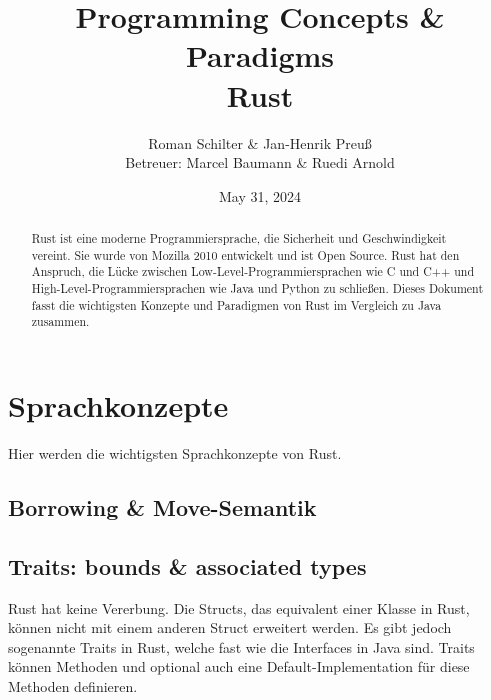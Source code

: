 \documentclass[letterpaper,12pt]{article}
\begin{document}
    \title{Programming Concepts \& Paradigms\\Rust}
    \author{Roman Schilter \& Jan-Henrik Preuß\\[0.4cm]{\small Betreuer: Marcel Baumann \& Ruedi Arnold}}
    \date{May 31, 2024}
    \maketitle


    \begin{abstract}
        Rust ist eine moderne Programmiersprache, die Sicherheit und Geschwindigkeit vereint.
        Sie wurde von Mozilla 2010 entwickelt und ist Open Source.
        Rust hat den Anspruch, die Lücke zwischen Low-Level-Programmiersprachen wie C und C++ und High-Level-Programmiersprachen wie Java und Python zu schließen.
        Dieses Dokument fasst die wichtigsten Konzepte und Paradigmen von Rust im Vergleich zu Java zusammen.
    \end{abstract}



    \section{Sprachkonzepte}

    Hier werden die wichtigsten Sprachkonzepte von Rust.

    \blindtext %

    \subsection{Borrowing \& Move-Semantik}\label{subsec:borrowing-&-move-semantik}

    \subsection{Traits: bounds \& associated types}\label{subsec:traits:-bounds-&-associated-types}
    Rust hat keine Vererbung.
    Die Structs, das equivalent einer Klasse in Rust, können nicht mit einem anderen Struct erweitert werden.
    Es gibt jedoch sogenannte Traits in Rust, welche fast wie die Interfaces in Java sind.
    Traits können Methoden und optional auch eine Default-Implementation für diese Methoden definieren.
\end{document}
